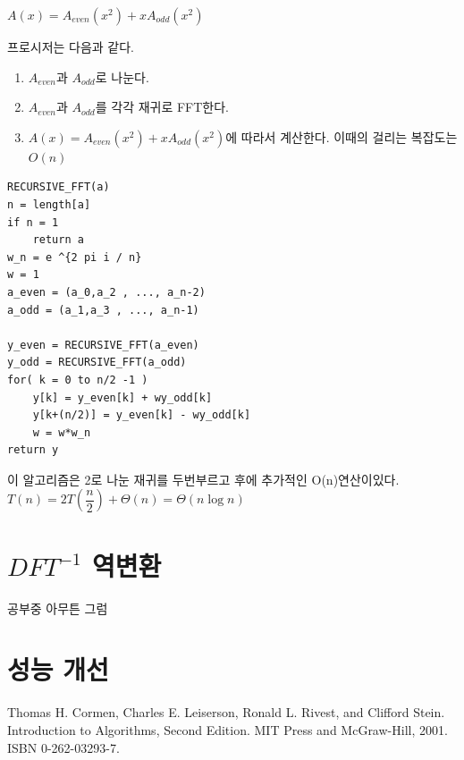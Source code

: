 \documentclass{oblivoir}
\begin{document}
$A(x) = A_{even}(x^2) + xA_{odd}(x^2) $

프로시저는 다음과 같다.
\begin{enumerate}
    \item $A_{even}$과 $A_{odd}$로 나눈다.
    \item $A_{even}$과 $A_{odd}$를 각각 재귀로 FFT한다.
    \item $A(x) = A_{even}(x^2) + xA_{odd}(x^2) $에 따라서 계산한다. 이때의 걸리는 복잡도는 $O(n)$
\end{enumerate}


\begin{lstlisting}[style = CStyle]
RECURSIVE_FFT(a)
n = length[a]
if n = 1
    return a
w_n = e ^{2 pi i / n}
w = 1
a_even = (a_0,a_2 , ..., a_n-2)
a_odd = (a_1,a_3 , ..., a_n-1)

y_even = RECURSIVE_FFT(a_even)
y_odd = RECURSIVE_FFT(a_odd)
for( k = 0 to n/2 -1 )
    y[k] = y_even[k] + wy_odd[k]
    y[k+(n/2)] = y_even[k] - wy_odd[k]
    w = w*w_n
return y
\end{lstlisting}

이 알고리즘은 2로 나눈 재귀를 두번부르고 후에 추가적인 O(n)연산이있다.
$T(n) = 2T\left(\dfrac{n}{2}\right) + \Theta(n) = \Theta(n \log n)$

\section{$DFT^{-1}$ 역변환}
공부중 아무튼 그럼



\section{성능 개선}


\begin{thebibliography}{}
    Thomas H. Cormen, Charles E. Leiserson, Ronald L. Rivest, and Clifford Stein. Introduction to Algorithms, Second Edition. MIT Press and McGraw-Hill, 2001. ISBN 0-262-03293-7.
\end{thebibliography}
\end{document}
